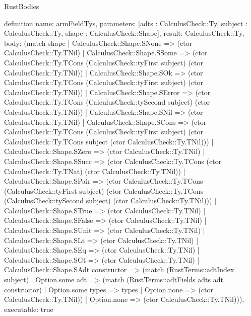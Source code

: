 \begin{lexlean}{RustBodies}
\begin{semanticmodule}
definition{
  name: armFieldTys,
  parameters: [adts : CalculusCheck::Ty, subject : CalculusCheck::Ty, shape : CalculusCheck::Shape],
  result: CalculusCheck::Ty,
  body: (match shape
    | CalculusCheck::Shape.SNone => (ctor CalculusCheck::Ty.TNil)
    | CalculusCheck::Shape.SSome => (ctor CalculusCheck::Ty.TCons (CalculusCheck::tyFirst subject) (ctor CalculusCheck::Ty.TNil))
    | CalculusCheck::Shape.SOk => (ctor CalculusCheck::Ty.TCons (CalculusCheck::tyFirst subject) (ctor CalculusCheck::Ty.TNil))
    | CalculusCheck::Shape.SError => (ctor CalculusCheck::Ty.TCons (CalculusCheck::tySecond subject) (ctor CalculusCheck::Ty.TNil))
    | CalculusCheck::Shape.SNil => (ctor CalculusCheck::Ty.TNil)
    | CalculusCheck::Shape.SCons => (ctor CalculusCheck::Ty.TCons (CalculusCheck::tyFirst subject) (ctor CalculusCheck::Ty.TCons subject (ctor CalculusCheck::Ty.TNil)))
    | CalculusCheck::Shape.SZero => (ctor CalculusCheck::Ty.TNil)
    | CalculusCheck::Shape.SSucc => (ctor CalculusCheck::Ty.TCons (ctor CalculusCheck::Ty.TNat) (ctor CalculusCheck::Ty.TNil))
    | CalculusCheck::Shape.SPair => (ctor CalculusCheck::Ty.TCons (CalculusCheck::tyFirst subject) (ctor CalculusCheck::Ty.TCons (CalculusCheck::tySecond subject) (ctor CalculusCheck::Ty.TNil)))
    | CalculusCheck::Shape.STrue => (ctor CalculusCheck::Ty.TNil)
    | CalculusCheck::Shape.SFalse => (ctor CalculusCheck::Ty.TNil)
    | CalculusCheck::Shape.SUnit => (ctor CalculusCheck::Ty.TNil)
    | CalculusCheck::Shape.SLt => (ctor CalculusCheck::Ty.TNil)
    | CalculusCheck::Shape.SEq => (ctor CalculusCheck::Ty.TNil)
    | CalculusCheck::Shape.SGt => (ctor CalculusCheck::Ty.TNil)
    | CalculusCheck::Shape.SAdt constructor => (match (RustTerms::adtIndex subject)
      | Option.some adt => (match (RustTerms::adtFields adts adt constructor)
        | Option.some types => types
        | Option.none => (ctor CalculusCheck::Ty.TNil))
      | Option.none => (ctor CalculusCheck::Ty.TNil))),
  executable: true
}


\end{semanticmodule}
\end{lexlean}
